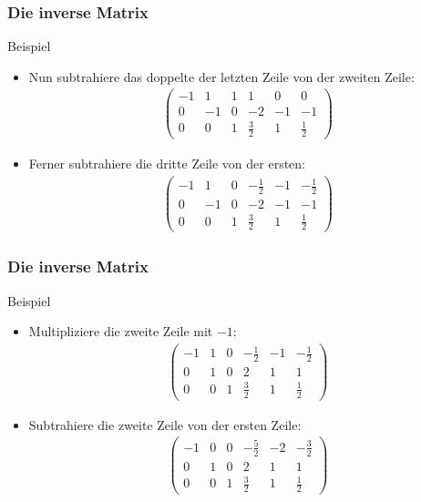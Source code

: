\documentclass{beamer}
\newcommand{\mytitle}{Die inverse Matrix}
\begin{document}
\begin{frame}\frametitle{\mytitle}
	\begin{block}{Beispiel}
	\begin{itemize}
		\item Nun subtrahiere das doppelte der letzten Zeile von der zweiten Zeile:
\begin{align*}
				\begin{pmatrix}
					-1&1&1&1&0&0\\0&-1&0&-2&-1&-1\\0&0&1&\frac{3}{2}&1&\frac{1}{2} 
				\end{pmatrix}
			\end{align*}
		\item Ferner subtrahiere die dritte Zeile von der ersten:
\begin{align*}
				\begin{pmatrix}
					-1&1&0&-\frac{1}{2}&-1&-\frac{1}{2}\\0&-1&0&-2&-1&-1\\0&0&1&\frac{3}{2}&1&\frac{1}{2} 
				\end{pmatrix}
			\end{align*}
	\end{itemize}	
	\end{block}
\end{frame}

\begin{frame}\frametitle{\mytitle}
	\begin{block}{Beispiel}
	\begin{itemize}
		\item Multipliziere die zweite Zeile mit $-1$:
\begin{align*}
				\begin{pmatrix}
					-1&1&0&-\frac{1}{2}&-1&-\frac{1}{2}\\0&1&0&2&1&1\\0&0&1&\frac{3}{2}&1&\frac{1}{2} 
				\end{pmatrix}
			\end{align*}
		\item Subtrahiere die zweite Zeile von der ersten Zeile:
\begin{align*}
				\begin{pmatrix}
					-1&0&0&-\frac{5}{2}&-2&-\frac{3}{2}\\0&1&0&2&1&1\\0&0&1&\frac{3}{2}&1&\frac{1}{2} 
				\end{pmatrix}
			\end{align*}
	\end{itemize}	
	\end{block}
\end{frame}
\end{document}
